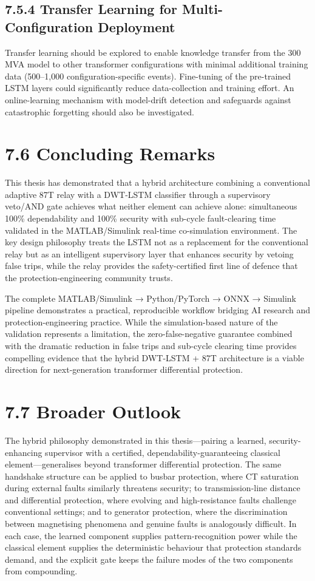 \subsection{7.5.4  Transfer Learning for Multi-Configuration Deployment}
Transfer learning should be explored to enable knowledge transfer from the 300 MVA model to other transformer configurations with minimal additional training data (500--1,000 configuration-specific events). Fine-tuning of the pre-trained LSTM layers could significantly reduce data-collection and training effort. An online-learning mechanism with model-drift detection and safeguards against catastrophic forgetting should also be investigated.


\section{7.6  Concluding Remarks}
This thesis has demonstrated that a hybrid architecture combining a conventional adaptive 87T relay with a DWT-LSTM classifier through a supervisory veto/AND gate achieves what neither element can achieve alone: simultaneous 100\% dependability and 100\% security with sub-cycle fault-clearing time validated in the MATLAB/Simulink real-time co-simulation environment. The key design philosophy treats the LSTM not as a replacement for the conventional relay but as an intelligent supervisory layer that enhances security by vetoing false trips, while the relay provides the safety-certified first line of defence that the protection-engineering community trusts.

The complete MATLAB/Simulink → Python/PyTorch → ONNX → Simulink pipeline demonstrates a practical, reproducible workflow bridging AI research and protection-engineering practice. While the simulation-based nature of the validation represents a limitation, the zero-false-negative guarantee combined with the dramatic reduction in false trips and sub-cycle clearing time provides compelling evidence that the hybrid DWT-LSTM + 87T architecture is a viable direction for next-generation transformer differential protection.


\section{7.7  Broader Outlook}
The hybrid philosophy demonstrated in this thesis---pairing a learned, security-enhancing supervisor with a certified, dependability-guaranteeing classical element---generalises beyond transformer differential protection. The same handshake structure can be applied to busbar protection, where CT saturation during external faults similarly threatens security; to transmission-line distance and differential protection, where evolving and high-resistance faults challenge conventional settings; and to generator protection, where the discrimination between magnetising phenomena and genuine faults is analogously difficult. In each case, the learned component supplies pattern-recognition power while the classical element supplies the deterministic behaviour that protection standards demand, and the explicit gate keeps the failure modes of the two components from compounding.

